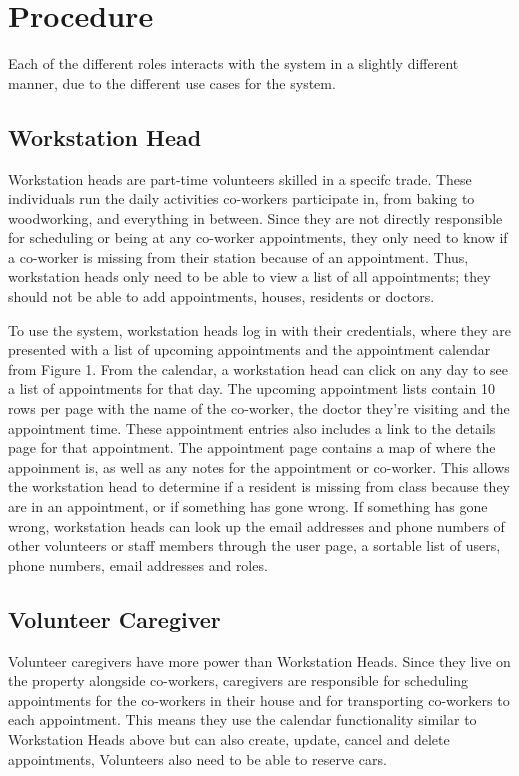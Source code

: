 \documentclass{sig-alternate}
\begin{document}
\section{Procedure}
Each of the different roles interacts with the system in a slightly different manner, due to the different use cases for the system.

\subsection{Workstation Head}
Workstation heads are part-time volunteers skilled in a specifc trade. These individuals run the daily activities co-workers participate in, from baking to woodworking, and everything in between. Since they are not directly responsible for scheduling or being at any co-worker appointments, they only need to know if a co-worker is missing from their station because of an appointment. Thus, workstation heads only need to be able to view a list of all appointments; they should not be able to add appointments, houses, residents or doctors.

To use the system, workstation heads log in with their credentials, where they are presented with a list of upcoming appointments and the appointment calendar from Figure 1. From the calendar, a workstation head can click on any day to see a list of appointments for that day. The upcoming appointment lists contain 10 rows per page with the name of the co-worker, the doctor they're visiting and the appointment time. These appointment entries also includes a link to the details page for that appointment. The appointment page contains a map of where the appoinment is, as well as any notes for the appointment or co-worker. This allows the workstation head to determine if a resident is missing from class because they are in an appointment, or if something has gone wrong. If something has gone wrong, workstation heads can look up the email addresses and phone numbers of other volunteers or staff members through the user page, a sortable list of users, phone numbers, email addresses and roles.

\subsection{Volunteer Caregiver}
Volunteer caregivers have more power than Workstation Heads. Since they live on the property alongside co-workers, caregivers are responsible for scheduling appointments for the co-workers in their house and for transporting co-workers to each appointment. This means they use the calendar functionality similar to Workstation Heads above but can also create, update, cancel and delete appointments, Volunteers also need to be able to reserve cars.
\end{document}
